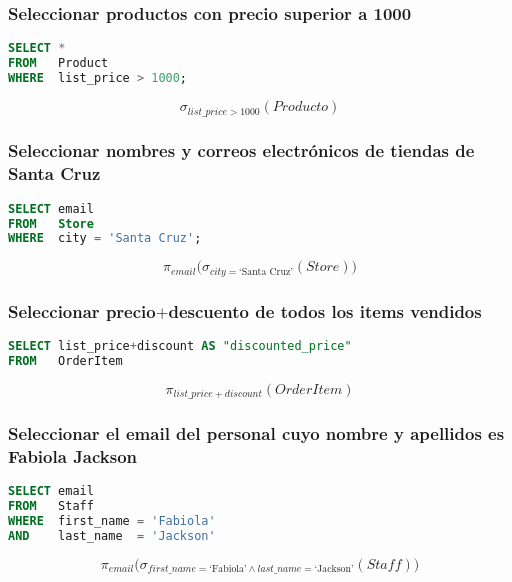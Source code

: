 \section{}

\subsubsection{Seleccionar productos con precio superior a 1000}

\begin{lstlisting}[language=SQL]
SELECT *
FROM   Product
WHERE  list_price > 1000;
\end{lstlisting}

\[\sigma_{list\_price>1000}(Producto)\]

\subsubsection{Seleccionar nombres y correos electrónicos de tiendas de Santa Cruz}

\begin{lstlisting}[language=SQL]
SELECT email
FROM   Store
WHERE  city = 'Santa Cruz';
\end{lstlisting}

\[\pi_{email}\big(\sigma_{city=\text{`Santa\ Cruz'}}(Store)\big)\]

\subsubsection{Seleccionar precio$+$descuento de todos los items vendidos}

\begin{lstlisting}[language=SQL]
SELECT list_price+discount AS "discounted_price"
FROM   OrderItem
\end{lstlisting}

\[\pi_{list\_price+discount}(OrderItem)\]

\subsubsection{Seleccionar el email del personal cuyo nombre y apellidos es Fabiola Jackson}

\begin{lstlisting}[language=SQL]
SELECT email
FROM   Staff
WHERE  first_name = 'Fabiola'
AND    last_name  = 'Jackson'
\end{lstlisting}

\[\pi_{email}\big(\sigma_{first\_name=\text{`Fabiola'}\land last\_name=\text{`Jackson'}}(Staff)\big)\]

